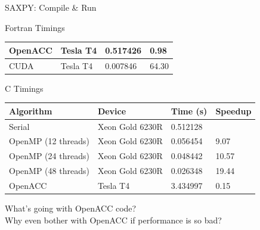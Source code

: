 \documentclass[10pt,t]{beamer}
\begin{document}
\begin{frame}{SAXPY: Compile \& Run}
\begin{exampleblock}{Fortran Timings}
{\begin{center}
\begin{tabular}{|bbbb|}
         \hline
         OpenACC & Tesla T4 & 0.517426 & 0.98  \\ %
         \hline
         CUDA & Tesla T4 & 0.007846 & 64.30 \\
        \hline
      \end{tabular}
    \end{center}
    }
  \end{exampleblock}
  \begin{exampleblock}{C Timings}
    {\scriptsize
    \begin{center}
      \begin{tabular}{|bbbb|}
        \hline
        \rowcolor{lublue}Algorithm & Device & Time (s) & Speedup \\
        \hline
         Serial & Xeon Gold 6230R & 0.512128 & \\
         \hline
         OpenMP (12 threads) & Xeon Gold 6230R & 0.056454 &  9.07 \\
         OpenMP (24 threads) & Xeon Gold 6230R & 0.048442 & 10.57 \\
         OpenMP (48 threads) & Xeon Gold 6230R & 0.026348 & 19.44 \\
         \hline
         OpenACC & Tesla T4 & 3.434997 & 0.15 \\ %
        \hline
      \end{tabular}
    \end{center}
    }
  \end{exampleblock}
  What's going with OpenACC code? \\
  Why even bother with OpenACC if performance is so bad?
 \end{frame}
\end{document}
